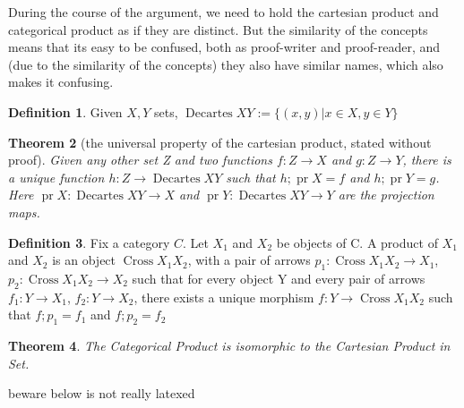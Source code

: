 \documentclass{proc-l}
\newtheorem{theorem}{Theorem}[section]
\theoremstyle{definition}
\newtheorem{definition}[theorem]{Definition}
\theoremstyle{remark}
\numberwithin{equation}{section}
\begin{document}
During the course of the argument, we need to hold the cartesian product and categorical product as
if they are distinct. But the similarity of the concepts means that its easy to be confused,
both as proof-writer and proof-reader, and (due to the similarity of the concepts) they also have 
similar names, which also makes it confusing.

\begin{definition}
Given \(X, Y\) sets, 
\(
\operatorname{Decartes} X Y := \{(x,y) | x \in X, y \in Y\}
\)
\end{definition}

\begin{theorem}[the universal property of the cartesian product, stated without proof]
Given any other set Z and two functions \(f: Z \to X\) and \(g: Z \to Y\),
there is a unique function \(h: Z \to \operatorname{Decartes} X Y\)
such that \(h; \operatorname{pr} X = f\) and \(h; \operatorname{pr} Y = g\).
Here \(\operatorname{pr} X: \operatorname{Decartes} X Y \to X\) and \(\operatorname{pr} Y: \operatorname{Decartes} X Y \to Y\) are the projection maps.
\end{theorem}


\begin{definition}

Fix a category \(C\). Let \(X_1\) and \(X_2\) be objects of C. A product of \(X_1\) and \(X_2\) is an object \(\operatorname{Cross} X_1 X_2\),
with a pair of arrows \(p_1: \operatorname{Cross} X_1 X_2 \to X_1\), \(p_2: \operatorname{Cross} X_1 X_2 \to X_2\)
such that
for every object Y and every pair of arrows \(f_1: Y \to X_1\), \(f_2: Y \to X_2\),
there exists a unique morphism \(f: Y \to \operatorname{Cross} X_1 X_2\) such that
\(f; p_1 = f_1\)
and 
\(f; p_2 = f_2\)
\end{definition}

\begin{theorem}
The Categorical Product is isomorphic to the Cartesian Product in Set.
\end{theorem}

{\huge beware below is not really latexed}
\end{document}
